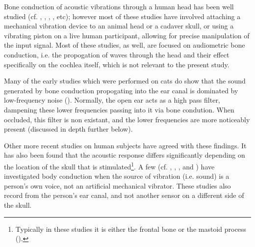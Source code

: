 \documentclass[dissertation,copyright]{uathesis}
\begin{document}

Bone conduction of acoustic vibrations through a human head has been well studied (cf. \cite{allen:60}, \cite{hakansson:94}, \cite{stenfelt:00}, \cite{reinfeldt:10}, etc); however most of these studies have involved attaching a mechanical vibration device to an animal head or a cadaver skull, or using a vibrating piston on a live human participant, allowing for precise manipulation of the input signal.  
Most of these studies, as well, are focused on audiometric bone conduction, i.e. the propogation of waves through the head and their effect specifically on the cochlea itself, which is not relevant to the present study.

Many of the early studies which were performed on cats do show that the sound generated by bone conduction propogating into the ear canal is dominated by low-frequency noise (\cite{tonndorf:72}).  Normally, the open ear acts as a high pass filter, dampening these lower frequencies passing into it via bone condution.  When occluded, this filter is non existant, and the lower frequencies are more noticeably present (discussed in depth further below). 

Other more recent studies on human subjects have agreed with these findings.  It has also been found that the acoustic response differs significantly depending on the location of the skull that is stimulated\footnote{Typically in these studies it is either the frontal bone or the mastoid process (\cite{bekesy:60}).}.
A few (cf. \cite{bekesy:48}, \cite{hansen:97b}, \cite{porschmann:00}, and \cite{reinfeldt:10}) have investigated body conduction when the source of vibration (i.e. sound) is a person's own voice, not an artificial mechanical vibrator.  These studies also record from the person's ear canal, and not another sensor on a different side of the skull.  
\end{document}
